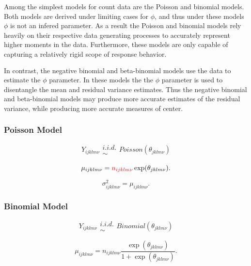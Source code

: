 \documentclass[12pt]{article}
\begin{document}
%
Among the simplest models for count data are the Poisson and binomial models. 
Both models are derived %
under limiting cases for $\phi$, and thus under these models $\phi$ is not an 
infered parameter. As a result the Poisson and binomial models rely heavily on 
their respective data generating processes to accurately represent higher 
moments in the data. Furthermore, these models are only capable of capturing a 
relatively rigid scope of response behavior.

%
In contrast, the negative binomial and beta-binomial models use the data to 
estimate the $\phi$ parameter. In these models the the $\phi$ parameter is used 
to disentangle the mean and residual variance estimates. Thus the negative 
binomial and beta-binomial models may produce more accurate estimates of the 
residual variance, while producing more accurate measures of center. 

%
\subsubsection{Poisson Model}

%
\begin{equation}
Y_{ijklm\nu} \substack{i.i.d.\\\sim} Poisson(\theta_{jklm\nu})
\end{equation}

\begin{equation}
\mu_{ijklm\nu} = {\color{red}n_{ijklm\nu}} \exp(\theta_{jklm\nu}).
\end{equation}

\begin{equation}
\sigma^2_{ijklm\nu} = \mu_{ijklm\nu}.
\end{equation}


%
\subsubsection{Binomial Model}

%
\begin{equation}
Y_{ijklm\nu} \substack{i.i.d.\\\sim} Binomial(\theta_{jklm\nu})
\end{equation}

\begin{equation}
\mu_{ijklm\nu} = n_{ijklm\nu}\frac{\exp(\theta_{jklm\nu})}{1+\exp(\theta_{jklm\nu})}.
\end{equation}
\end{document}
